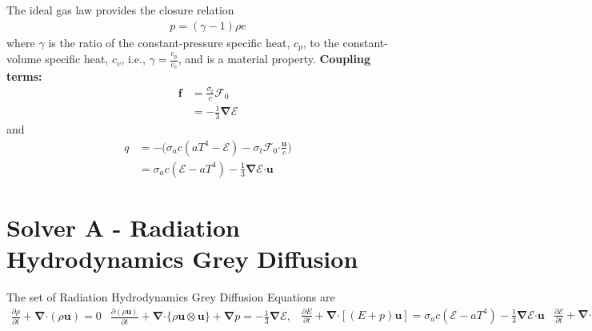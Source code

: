 \documentclass[10pt,letterpaper,notitlepage]{article}
\numberwithin{equation}{section}
\newcommand{\partialderiv}[2]{\frac{\partial #1}{\partial #2}}
\newcommand{\bnabla}{\boldsymbol{\nabla}}
\newcommand{\velocity}{\mathbf{u}}
\newcommand{\dotp}{\boldsymbol{\cdot}}
\newcommand{\RadE}{\mathcal{E}}
\newcommand{\RadF}{\boldsymbol{\mathcal{F}}}
\newcommand{\beqn}{\begin{equation}\begin{aligned}}
\newcommand{\eeqn}{\end{aligned}\end{equation}}
\begin{document}
The ideal gas law provides the closure relation
\beqn 
p = (\gamma - 1) \rho e
\eeqn 
where $\gamma$ is the ratio of the constant-pressure specific heat, $c_p$, to the constant-volume specific heat, $c_v$, i.e., $\gamma = \frac{c_p}{c_v}$, and is a material property.
\newline
\newline
\textbf{Coupling terms:}\newline
\beqn 
\mathbf{f} &= \frac{\sigma_t}{c} \RadF_0 \\ &= -\frac{1}{3} \bnabla \RadE
\eeqn 
and
\beqn 
q &= - \biggr(\sigma_a c (a T^4 - \RadE) - \sigma_t \RadF_0 \dotp \frac{\mathbf{u}}{c} \biggr)\\
&= \sigma_a c (\RadE - a T^4) - \frac{1}{3} \bnabla \RadE \dotp \velocity
\eeqn 

\newpage
\section{Solver A - Radiation Hydrodynamics Grey Diffusion}
The set of Radiation Hydrodynamics Grey Diffusion Equations are
\begin{subequations}
\beqn 
\partialderiv{\rho}{t} + \bnabla \dotp (\rho \velocity) = 0
\eeqn 
\beqn 
\partialderiv{(\rho\velocity)}{t} + \bnabla \dotp \{ \rho \velocity \otimes \velocity\}  + \bnabla p 
= -\frac{1}{3} \bnabla \RadE,
\eeqn 
\beqn 
\partialderiv{E}{t} + \bnabla \dotp [(E + p)\velocity] 
= \sigma_a c (\RadE - a T^4) - \frac{1}{3} \bnabla \RadE \dotp \velocity
\eeqn 
\beqn 
\frac{\partial \RadE}{\partial t} 
+\bnabla \dotp \biggr(  -\frac{c}{3\sigma_t} \bnabla \RadE \biggr) + \frac{4}{3} \bnabla \bigr( \RadE \mathbf{u}  \bigr)
&=  \sigma_a c \bigr( aT^4 - \RadE \bigr)
+\frac{1}{3} \bnabla \RadE  \dotp \velocity.
\eeqn
where
\beqn 
E = \frac{1}{2} \rho ||\velocity||^2 + \rho e,
\eeqn 
\beqn 
p = (\gamma - 1) \rho e,
\eeqn 
\beqn 
T = \frac{1}{C_v} e
\eeqn 
\beqn 
\sigma_t(T) &= \sigma_s(T) + \sigma_a(T)\\
\eeqn 
\beqn 
\sigma_s(T) &= \rho \kappa_s (T) \\
\eeqn 
\beqn 
\sigma_a(T) &= \rho \kappa_a (T)
\eeqn 
\end{subequations}
\end{document}
